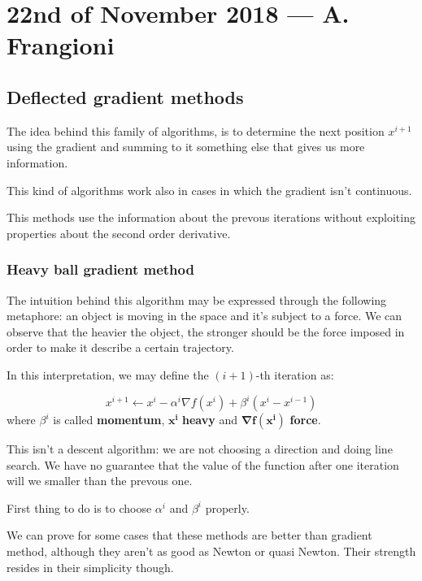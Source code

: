 \documentclass[ComputationalMathematics.tex]{subfiles}
\begin{document}
\section{22nd of November 2018 --- A. Frangioni}

\subsection{Deflected gradient methods}
The idea behind this family of algorithms, is to determine the next position $x^{i+1}$ using the gradient and summing to it something else that gives us more information.

This kind of algorithms work also in cases in which the gradient isn't continuous.

This methods use the information about the prevous iterations without exploiting properties about the second order derivative.

\subsubsection{Heavy ball gradient method}
The intuition behind this algorithm may be expressed through the following metaphore: an object is moving in the space and it's subject to a force. We can observe that the heavier the object, the stronger should be the force imposed in order to make it describe a certain trajectory.

In this interpretation, we may define the $(i+1)$-th iteration as:

\[
  x^{i+1} \gets x^i - \alpha^i \nabla f(x^i) + \beta^i (x^i - x^{i-1})
\]
 where {\boldmath${\beta^i}$} is called \textbf{momentum}, $\mathbf{x^i}$ \textbf{heavy} and $\mathbf{\nabla f(x^i)}$ \textbf{force}.

This isn't a descent algorithm: we are not choosing a direction and doing line search. We have no guarantee that the value of the function after one iteration will we smaller than the prevous one.

First thing to do is to choose $\alpha^i$ and $\beta^i$ properly.

We can prove for some cases that these methods are better than gradient method, although they aren't as good as Newton or quasi Newton. Their strength resides in their simplicity though.
\end{document}
